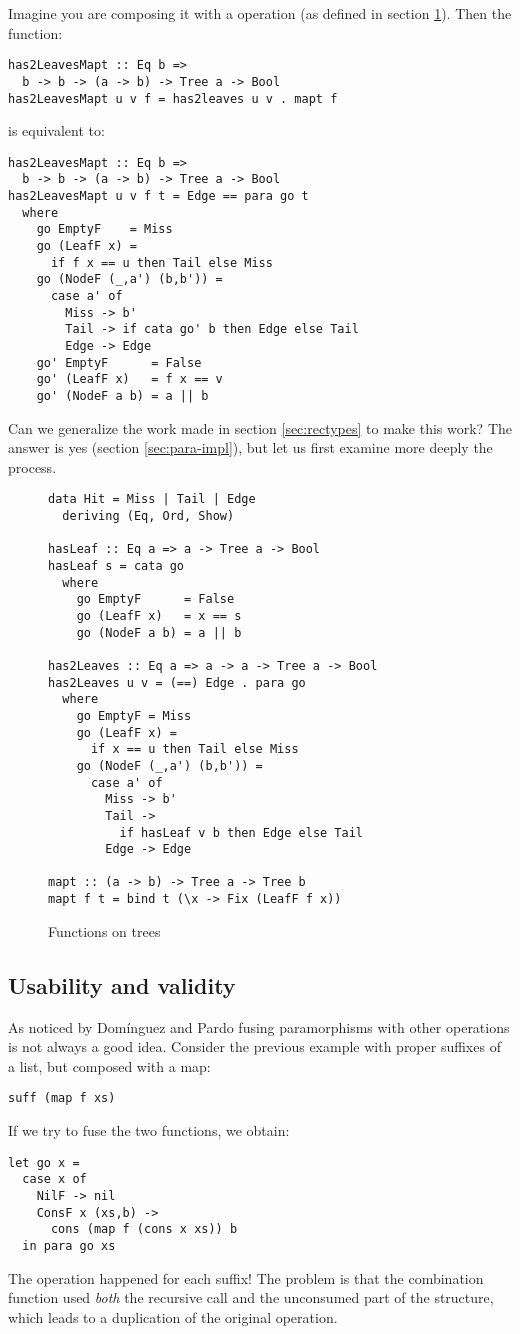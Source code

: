 Imagine you are composing it with a  operation (as defined in section \ref{fig:has2Leaves}). Then
the function:
\begin{verbatim}
has2LeavesMapt :: Eq b =>
  b -> b -> (a -> b) -> Tree a -> Bool
has2LeavesMapt u v f = has2leaves u v . mapt f
\end{verbatim}
\noindent is equivalent to:
\begin{verbatim}
has2LeavesMapt :: Eq b =>
  b -> b -> (a -> b) -> Tree a -> Bool
has2LeavesMapt u v f t = Edge == para go t
  where
    go EmptyF    = Miss
    go (LeafF x) =
      if f x == u then Tail else Miss
    go (NodeF (_,a') (b,b')) =
      case a' of
        Miss -> b'
        Tail -> if cata go' b then Edge else Tail
        Edge -> Edge
    go' EmptyF      = False
    go' (LeafF x)   = f x == v
    go' (NodeF a b) = a || b
\end{verbatim}

\noindent Can we generalize the work made in section \ref{sec:rectypes} to make this work? The answer is yes (section \ref{sec:para-impl}), but let us first examine more deeply the process.

\begin{figure}
\begin{verbatim}
data Hit = Miss | Tail | Edge
  deriving (Eq, Ord, Show)

hasLeaf :: Eq a => a -> Tree a -> Bool
hasLeaf s = cata go
  where
    go EmptyF      = False
    go (LeafF x)   = x == s
    go (NodeF a b) = a || b

has2Leaves :: Eq a => a -> a -> Tree a -> Bool
has2Leaves u v = (==) Edge . para go
  where
    go EmptyF = Miss
    go (LeafF x) =
      if x == u then Tail else Miss
    go (NodeF (_,a') (b,b')) =
      case a' of
        Miss -> b'
        Tail ->
          if hasLeaf v b then Edge else Tail
        Edge -> Edge

mapt :: (a -> b) -> Tree a -> Tree b
mapt f t = bind t (\x -> Fix (LeafF f x))
\end{verbatim}
\caption{Functions on trees}
\label{fig:has2Leaves}
\end{figure}

\subsection{Usability and validity}
As noticed by Domínguez and Pardo \cite{paramorphismFusion} fusing paramorphisms with other operations is not always a good idea. Consider the previous example with proper suffixes of a list, but composed with a map:
\begin{verbatim}
suff (map f xs)
\end{verbatim}
\noindent If we try to fuse the two functions, we obtain:
\begin{verbatim}
let go x =
  case x of
    NilF -> nil
    ConsF x (xs,b) ->
      cons (map f (cons x xs)) b
  in para go xs
\end{verbatim}
\noindent The  operation happened for each suffix! The problem is that the combination function used \emph{both} the recursive call and the unconsumed part of the structure, which leads to a duplication of the original  operation.

